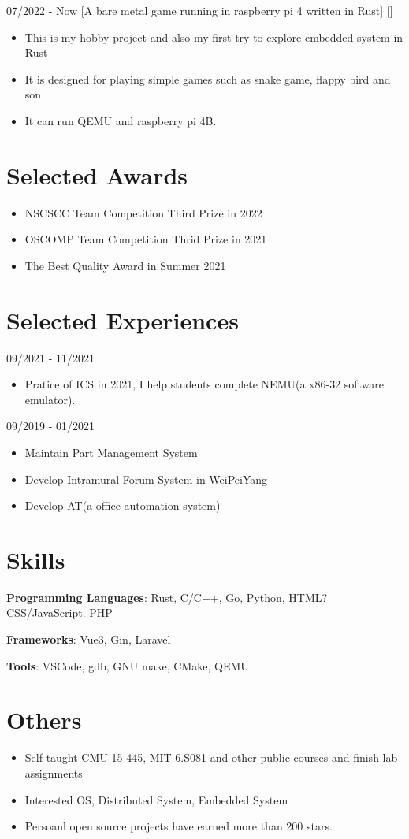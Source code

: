 \documentclass{chicv}
\begin{document}
  {07/2022 - Now}
  [A bare metal game running in raspberry pi 4 written in Rust]
  []
  \begin{itemize}
    \item This is my hobby project and also my first try to explore embedded system in Rust 
    \item It is designed for playing simple games such as snake game, flappy bird and son 
    \item It can run QEMU and raspberry pi 4B.
  \end{itemize}

\section{Selected Awards}
\begin{itemize}
  \item NSCSCC Team Competition Third Prize in 2022
  \item OSCOMP Team Competition Thrid Prize in 2021
  \item The Best Quality Award in Summer 2021
\end{itemize}

\section{Selected Experiences}
{09/2021 - 11/2021}
\begin{itemize}
  \item Pratice of ICS in 2021, I help students complete NEMU(a x86-32 software emulator).
\end{itemize}

{09/2019 - 01/2021}
\begin{itemize}
  \item Maintain Part Management System 
  \item Develop Intramural Forum System in WeiPeiYang
  \item Develop AT(a office automation system)
\end{itemize}



\section{Skills}

\begin{compactlist}
  \item \textbf{Programming Languages}: Rust, C/C++, Go, Python, HTML?CSS/JavaScript. PHP
  \item \textbf{Frameworks}: Vue3, Gin, Laravel
  \item \textbf{Tools}: VSCode, gdb, GNU make, CMake, QEMU
\end{compactlist}

\section{Others}
\begin{itemize}
  \item Self taught CMU 15-445, MIT 6.S081 and other public courses and finish lab assignments 
  \item Interested OS, Distributed System, Embedded System 
  \item Persoanl open source projects have earned more than 200 stars.
\end{itemize}
\end{document}
